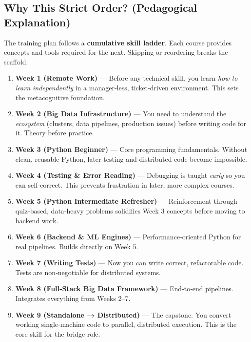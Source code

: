 \documentclass[12pt]{article}
\begin{document}
	\subsection*{Why This Strict Order? (Pedagogical Explanation)}
	
	The training plan follows a \textbf{cumulative skill ladder}. Each course provides concepts and tools required for the next. Skipping or reordering breaks the scaffold.
	
	\begin{enumerate}
		\item \textbf{Week 1 (Remote Work)} — Before any technical skill, you learn \emph{how to learn independently} in a manager‑less, ticket‑driven environment. This sets the metacognitive foundation.
		
		\item \textbf{Week 2 (Big Data Infrastructure)} — You need to understand the \emph{ecosystem} (clusters, data pipelines, production issues) before writing code for it. Theory before practice.
		
		\item \textbf{Week 3 (Python Beginner)} — Core programming fundamentals. Without clean, reusable Python, later testing and distributed code become impossible.
		
		\item \textbf{Week 4 (Testing \& Error Reading)} — Debugging is taught \emph{early} so you can self‑correct. This prevents frustration in later, more complex courses.
		
		\item \textbf{Week 5 (Python Intermediate Refresher)} — Reinforcement through quiz‑based, data‑heavy problems solidifies Week 3 concepts before moving to backend work.
		
		\item \textbf{Week 6 (Backend \& ML Engines)} — Performance‑oriented Python for real pipelines. Builds directly on Week 5.
		
		\item \textbf{Week 7 (Writing Tests)} — Now you can write correct, refactorable code. Tests are non‑negotiable for distributed systems.
		
		\item \textbf{Week 8 (Full‑Stack Big Data Framework)} — End‑to‑end pipelines. Integrates everything from Weeks 2–7.
		
		\item \textbf{Week 9 (Standalone → Distributed)} — The capstone. You convert working single‑machine code to parallel, distributed execution. This is the core skill for the bridge role.
	\end{enumerate}
	
\end{document}
